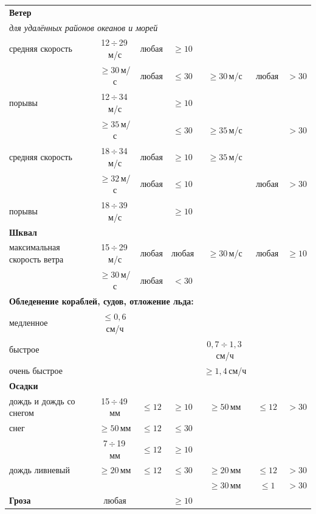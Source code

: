 \documentclass[a4paper, 12pt, twoside, draft, book, russian, fittopage, cyremdash, openright]{ncc}
\newcommand{\mps}{\,м/с\xspace}
\newcommand{\otdo}{\,\ensuremath{\div}\,}
\renewcommand{\le}{\leqslant}
\renewcommand{\ge}{\geqslant}
\begin{document}
\begin{longtable}{l|c|c|c|c|c|c}
  \multicolumn{7}{l}{\textbf{Ветер}} \\*
  \multicolumn{7}{l}{\textit{для удалённых районов океанов и морей}} \\*
  средняя скорость & 12\otdo29\mps & любая & $\ge10$  &               &       &        \\*
  {}               & $\ge30$\mps   & любая & $\le30$  & $\ge30$\mps   & любая & $>30$  \\
  порывы           & 12\otdo34\mps &       & $\ge10$  &               &       &        \\*
  {}               & $\ge35$\mps   &       & $\le30$  & $\ge35$\mps   &       & $>30$  \\
  \midrule
  средняя скорость & 18\otdo34\mps & любая & $\ge10$  & $\ge35$\mps   &       &        \\*
  {}               & $\ge32$\mps   & любая & $\le10$  &               & любая & $>30$  \\
  порывы           & 18\otdo39\mps &       & $\ge10$  &               &       &        \\
  \midrule

  \multicolumn{7}{l}{\textbf{Шквал}} \\*
  максимальная скорость ветра
  {}               & 15\otdo29\mps & любая & любая    & $\ge30$\mps   & любая &$\ge10$ \\*
  {}               & $\ge30$\mps   & любая & $<30$    &               &       &        \\ 
  \midrule

  \multicolumn{7}{l}{\textbf{Обледенение кораблей, судов, отложение льда:}} \\*
  медленное        & $\le0,6$\,см/ч &      &          &               &       &         \\
  \midrule
  быстрое          &               &       &          & $0,7\div1,3$\,см/ч &  &         \\
  \midrule
  очень быстрое    &               &       &          & $\ge1,4$\,см/ч &      &         \\
  \midrule

  \multicolumn{7}{l}{\textbf{Осадки}} \\*
  дождь и дождь со снегом & 15\otdo49\,мм & $\le12$ & $\ge10$ & $\ge50$\,мм & $\le12$ & $>30$ \\
  \midrule
  снег             & $\ge50$\,мм   & $\le12$ & $\le30$ &               &      &         \\*
  {}               & 7\otdo19\,мм  & $\le12$ & $\ge10$ &               &      &         \\
  \midrule
  дождь ливневый   & $\ge20$\,мм   & $\le12$ & $\le30$ & $\ge20$\,мм  & $\le12$ & $>30$ \\*
  {}               &               &         &         & $\ge30$\,мм   & $\le1$ & $>30$ \\
  \midrule
  \textbf{Гроза}   & любая         &         & $\ge10$ &               &      &         \\
  \midrule


\end{longtable}
\end{document}
